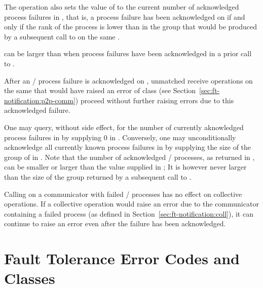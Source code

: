 The operation also sets the value of  to the current number of acknowledged process
failures in , that is, a process failure has been acknowledged on  if and only if
the rank of the process is lower than  in the group that would be produced by a subsequent call to
 on the same .

 can be larger than  when process failures have been acknowledged in a prior call
to .

After an \MPI/ process failure is acknowledged on , unmatched  receive operations
on the same  that would have raised an error of class 
(see Section~\ref{sec:ft-notification:p2p-comm}) proceed without further
raising errors due to this acknowledged failure.

\begin{users}
    One may query, without side effect, for the number of currently aknowledged
    process failures in  by supplying $0$ in .
    Conversely, one may unconditionally acknowledge all currently known process
    failures in  by supplying the size of the group of 
    in .
    Note that the number of acknowledged \MPI/ processes, as returned in ,
    can be smaller or larger than the value supplied in ; It is
    however never larger than the size of the group returned by a subsequent call
    to .

    Calling  on a communicator with failed
    \MPI/ processes has no effect on collective operations.
    If a collective operation would raise an
    error due to the communicator containing a failed process (as
    defined in Section~\ref{sec:ft-notification:coll}), it can
    continue to raise an error even after the failure has been
    acknowledged.
\end{users}

\section{Fault Tolerance Error Codes and Classes}
\label{sec:ft-errorcodes}

